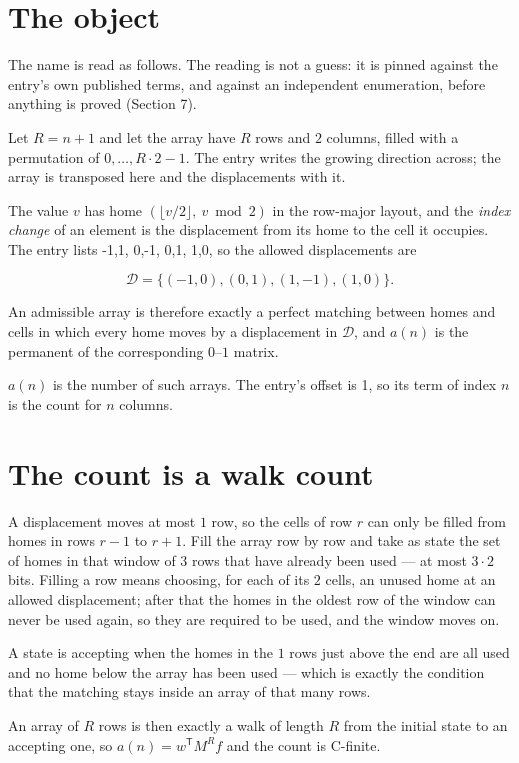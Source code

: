 \documentclass[11pt]{article}
\theoremstyle{definition}
\begin{document}
\section{The object}

The name is read as follows. The reading is not a guess: it is pinned against the entry's own published terms, and against an independent enumeration, before anything is proved (Section 7).

Let $R = n + 1$ and let the array have $R$ rows and $2$ columns, filled with a permutation of $0,\dots,R\cdot2-1$. The entry writes the growing direction across; the array is transposed here and the displacements with it.

The value $v$ has home $(\lfloor v/2\rfloor,\ v \bmod 2)$ in the row-major layout, and the {\itshape index change} of an element is the displacement from its home to the cell it occupies. The entry lists -1,1, 0,-1, 0,1, 1,0, so the allowed displacements are

\[\mathcal{D} = \{(-1,0), (0,1), (1,-1), (1,0)\}.\]

An admissible array is therefore exactly a perfect matching between homes and cells in which every home moves by a displacement in $\mathcal{D}$, and $a(n)$ is the permanent of the corresponding $0$--$1$ matrix.

$a(n)$ is the number of such arrays. The entry's offset is 1, so its term of index $n$ is the count for $n$ columns.

\section{The count is a walk count}

A displacement moves at most $1$ row, so the cells of row $r$ can only be filled from homes in rows $r-1$ to $r+1$. Fill the array row by row and take as state the set of homes in that window of $3$ rows that have already been used --- at most $3\cdot2$ bits. Filling a row means choosing, for each of its $2$ cells, an unused home at an allowed displacement; after that the homes in the oldest row of the window can never be used again, so they are required to be used, and the window moves on.

A state is accepting when the homes in the $1$ rows just above the end are all used and no home below the array has been used --- which is exactly the condition that the matching stays inside an array of that many rows.

An array of $R$ rows is then exactly a walk of length $R$ from the initial state to an accepting one, so $a(n) = w^{\mathsf T}M^{R}f$ and the count is C-finite.
\end{document}
